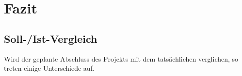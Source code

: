 \section{Fazit} 
\label{sec:Fazit}

\subsection{Soll-/Ist-Vergleich}
\label{sec:SollIstVergleich}
	Wird der geplante Abschluss des Projekts mit dem tatsächlichen verglichen, so treten einige Unterschiede auf.

